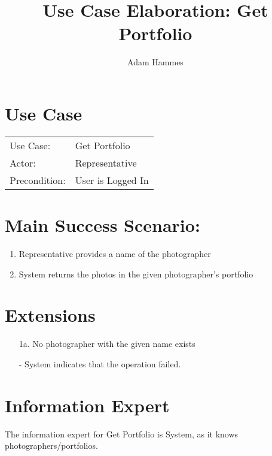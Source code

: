 \documentclass{article}
\title{Use Case Elaboration: Get Portfolio}
\author{ Adam Hammes }
\begin{document}
\maketitle


\section*{Use Case}
\begin{tabular}{l l}
Use Case:     & Get Portfolio\\
Actor:        & Representative\\
Precondition: & User is Logged In\\
\end{tabular}


\section*{Main Success Scenario:}

\begin{enumerate}
    \item Representative provides a name of the photographer
    \item System returns the photos in the given photographer's portfolio
\end{enumerate}

\section*{Extensions}

\begin{itemize}
    \item [1a.] No photographer with the given name exists
    
    - System indicates that the operation failed.
                            
\end{itemize}


\section*{Information Expert}

The information expert for Get Portfolio is System, as it knows photographers/portfolios.
\end{document}
